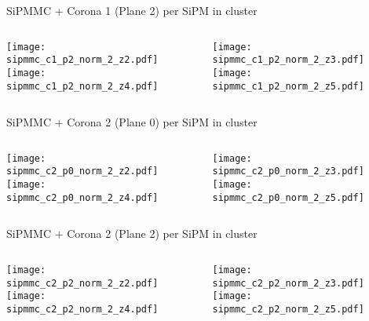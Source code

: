 \documentclass{beamer}
\begin{document}
\begin{frame}{SiPMMC + Corona 1 (Plane 2) per SiPM in cluster}
	\begin{columns}[onlytextwidth]
		\begin{column}{0.5\textwidth}
			\texttt{[image: sipmmc\_c1\_p2\_norm\_2\_z2.pdf]} \\
			\texttt{[image: sipmmc\_c1\_p2\_norm\_2\_z4.pdf]}
		 \end{column}
		 \begin{column}{0.5\textwidth}
			\texttt{[image: sipmmc\_c1\_p2\_norm\_2\_z3.pdf]} \\
			\texttt{[image: sipmmc\_c1\_p2\_norm\_2\_z5.pdf]}
		 \end{column}
 \end{columns}
\end{frame}


\begin{frame}{SiPMMC + Corona 2 (Plane 0) per SiPM in cluster}
	\begin{columns}[onlytextwidth]
		\begin{column}{0.5\textwidth}
			\texttt{[image: sipmmc\_c2\_p0\_norm\_2\_z2.pdf]} \\
			\texttt{[image: sipmmc\_c2\_p0\_norm\_2\_z4.pdf]}
		 \end{column}
		 \begin{column}{0.5\textwidth}
			\texttt{[image: sipmmc\_c2\_p0\_norm\_2\_z3.pdf]} \\
			\texttt{[image: sipmmc\_c2\_p0\_norm\_2\_z5.pdf]}
		 \end{column}
 \end{columns}
\end{frame}

\begin{frame}{SiPMMC + Corona 2 (Plane 2) per SiPM in cluster}
	\begin{columns}[onlytextwidth]
		\begin{column}{0.5\textwidth}
			\texttt{[image: sipmmc\_c2\_p2\_norm\_2\_z2.pdf]} \\
			\texttt{[image: sipmmc\_c2\_p2\_norm\_2\_z4.pdf]}
		 \end{column}
		 \begin{column}{0.5\textwidth}
			\texttt{[image: sipmmc\_c2\_p2\_norm\_2\_z3.pdf]} \\
			\texttt{[image: sipmmc\_c2\_p2\_norm\_2\_z5.pdf]}
		 \end{column}
 \end{columns}
\end{frame}
\end{document}
